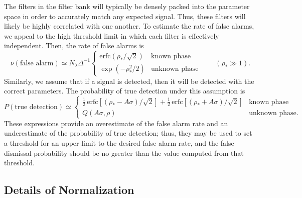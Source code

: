 The filters in the filter bank will typically be densely packed into
the parameter space in order to accurately match any expected signal.
Thus, these filters will likely be highly correlated with one another.
To estimate the rate of false alarms, we appeal to the high threshold
limit in which each filter is effectively independent.  Then, the
rate of false alarms is
\begin{equation}
  \nu(\mbox{false alarm}) \simeq N_\lambda\Delta^{-1} \left\{
  \begin{array}{ll}
    {\mathrm{erfc}}(\rho_\ast/\surd2) & \mbox{known phase} \\[6pt]
    \exp(-\rho_\ast^2/2)              & \mbox{unknown phase}
  \end{array}
  \right. \qquad (\rho_\ast\gg1).
\end{equation}
Similarly, we assume that if a signal is detected, then it
will be detected with the correct parameters.  The probability
of true detection under this assumption is
\begin{equation}
  P(\mbox{true detection}) \simeq \left\{
  \begin{array}{ll}
    {\textstyle\frac{1}{2}}\,{\mathrm{erfc}}[(\rho_\ast-A\sigma)/\surd2]
    + {\textstyle\frac{1}{2}}\,{\mathrm{erfc}}[(\rho_\ast+A\sigma)/\surd2]
                   & \mbox{known phase} \\[6pt]
    Q(A\sigma,\rho) & \mbox{unknown phase}.
  \end{array}
  \right.
\end{equation}
These expressions provide an overestimate of the false alarm rate
and an underestimate of the probability of true detection; thus, they may
be used to set a threshold for an upper limit to the desired false alarm
rate, and the false dismissal probability should be no greater than the
value computed from that threshold.


\clearpage
\subsection{Details of Normalization}
\label{ss:norm_details}

